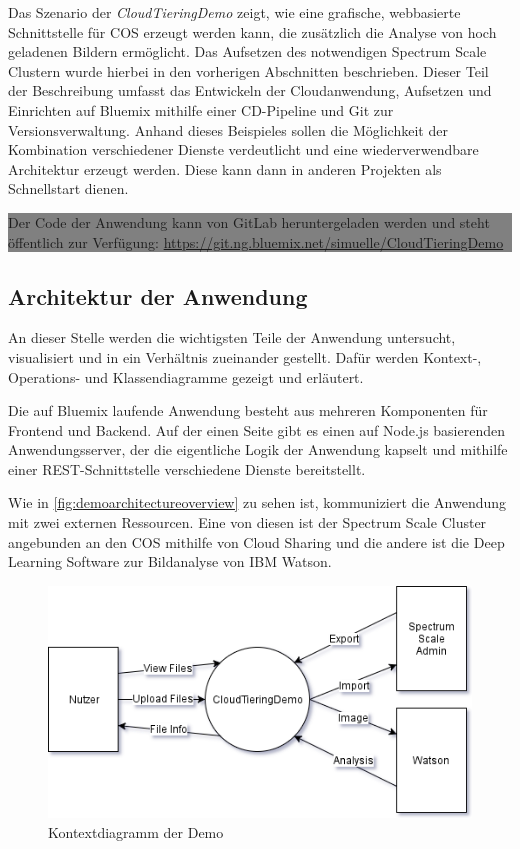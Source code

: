 Das Szenario der \textit{CloudTieringDemo} zeigt, wie eine grafische, webbasierte Schnittstelle für \ac{COS} erzeugt werden kann, die zusätzlich die Analyse von hoch geladenen Bildern ermöglicht. Das Aufsetzen des notwendigen Spectrum Scale Clustern wurde hierbei in den vorherigen Abschnitten beschrieben.
Dieser Teil der Beschreibung umfasst das Entwickeln der Cloudanwendung, Aufsetzen und Einrichten auf Bluemix mithilfe einer \ac{CD}-Pipeline und \gls{Git} zur Versionsverwaltung. Anhand dieses Beispieles sollen die Möglichkeit der Kombination verschiedener Dienste verdeutlicht und eine wiederverwendbare Architektur erzeugt werden. Diese kann dann in anderen Projekten als Schnellstart dienen.

\begin{center}
	\colorbox{gray}{\parbox{0.9\textwidth}{Der Code der Anwendung kann von GitLab heruntergeladen werden und steht öffentlich zur Verfügung: \url{https://git.ng.bluemix.net/simuelle/CloudTieringDemo}}}
\end{center}

\subsection{Architektur der Anwendung}
An dieser Stelle werden die wichtigsten Teile der Anwendung untersucht, visualisiert und in ein Verhältnis zueinander gestellt. Dafür werden Kontext-, Operations- und Klassendiagramme gezeigt und erläutert.

Die auf Bluemix laufende Anwendung besteht aus mehreren Komponenten für Frontend und Backend. Auf der einen Seite gibt es einen auf Node.js basierenden Anwendungsserver, der die eigentliche Logik der Anwendung kapselt und mithilfe einer \gls{REST}-Schnittstelle verschiedene Dienste bereitstellt.

Wie in \autoref{fig:demoarchitectureoverview} zu sehen ist, kommuniziert die Anwendung mit zwei externen Ressourcen. Eine von diesen ist der Spectrum Scale Cluster angebunden an den \ac{COS} mithilfe von Cloud Sharing und die andere ist die Deep Learning Software zur Bildanalyse von IBM Watson.

\begin{figure}[hbt]
	\centering
	\includegraphics[scale=0.75]{images/demo-context-diagram}
	\caption{Kontextdiagramm der Demo}
	\label{fig:democontextdiagram}
\end{figure}

